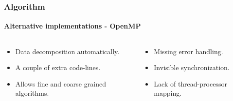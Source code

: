\frame
{
    \frametitle{Algorithm}
    \framesubtitle{Alternative implementations - OpenMP}
    \begin{columns}
        \begin{column}{0.5\textwidth}
            \begin{itemize}
                \item Data decomposition automatically.
                \item A couple of extra code-lines.
                \item Allows fine and coarse grained algorithms.
            \end{itemize}
        \end{column}
        \begin{column}{0.5\textwidth}
            \begin{itemize}
                \item Missing error handling.
                \item Invisible synchronization.
                \item Lack of thread-processor mapping.
            \end{itemize}
        \end{column}
    \end{columns}
}

